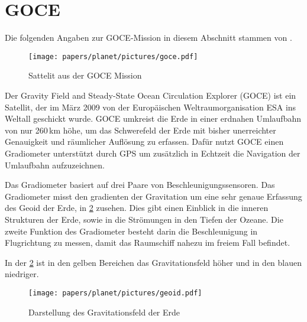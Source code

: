 %
%
%
%
\section{GOCE
\label{planet:section:goce}}

Die folgenden Angaben zur GOCE-Mission in diesem Abschnitt stammen von \cite{planet:goce}.

\begin{figure}[h]
    \centering
    \texttt{[image: papers/planet/pictures/goce.pdf]}
    \caption{Sattelit aus der GOCE Mission \cite{planet:gocepic}
        \label{planet:fig:goce}}
\end{figure}

Der Gravity Field and Steady-State Ocean Circulation Explorer (GOCE) ist ein Satellit, der im März 2009 von der Europäischen Weltraumorganisation ESA ins Weltall geschickt wurde.
GOCE umkreist die Erde in einer erdnahen Umlaufbahn von nur 260\,km höhe, um das Schwerefeld der Erde mit bisher unerreichter Genauigkeit und räumlicher Auflösung zu erfassen.
Dafür nutzt GOCE einen Gradiometer unterstützt durch GPS um zusätzlich in Echtzeit die Navigation der Umlaufbahn aufzuzeichnen.

Das Gradiometer basiert auf drei Paare von Beschleunigungssensoren.
Das Gradiometer misst den gradienten der Gravitation um eine sehr genaue Erfassung des Geoid der Erde, in \cref{planet:fig:geoid} zusehen.
Dies gibt einen Einblick in die inneren Strukturen der Erde, sowie in die Strömungen in den Tiefen der Ozeane.
Die zweite Funktion des Gradiometer besteht darin die Beschleunigung in Flugrichtung zu messen, damit das Raumschiff nahezu im freiem Fall befindet.

In der \cref*{planet:fig:geoid} ist in den gelben Bereichen das Gravitationsfeld höher und in den blauen niedriger.

\begin{figure}[h]
    \centering
    \texttt{[image: papers/planet/pictures/geoid.pdf]}
    \caption{Darstellung des Gravitationsfeld der Erde \cite{planet:geoidpic}
        \label{planet:fig:geoid}}
\end{figure}


